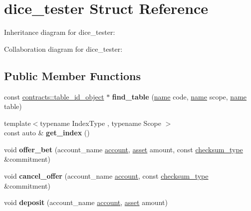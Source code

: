 \hypertarget{structdice__tester}{}\section{dice\+\_\+tester Struct Reference}
\label{structdice__tester}


Inheritance diagram for dice\+\_\+tester\+:


Collaboration diagram for dice\+\_\+tester\+:
\subsection*{Public Member Functions}
\begin{DoxyCompactItemize}
\item 
\mbox{\label{structdice__tester_acbb49bccd8d11937eb1e16b912f11a55}} 
const \mbox{\hyperlink{classaacio_1_1chain_1_1contracts_1_1table__id__object}{contracts\+::table\+\_\+id\+\_\+object}} $\ast$ {\bfseries find\+\_\+table} (\mbox{\hyperlink{structaacio_1_1name}{name}} code, \mbox{\hyperlink{structaacio_1_1name}{name}} scope, \mbox{\hyperlink{structaacio_1_1name}{name}} table)
\item 
\mbox{\label{structdice__tester_af6d80841bf61f9543fad2e4060cea135}} 
{\footnotesize template$<$typename Index\+Type , typename Scope $>$ }\\const auto \& {\bfseries get\+\_\+index} ()
\item 
\mbox{\label{structdice__tester_a12ac8f62896ba5ee9a10e6bee184c415}} 
void {\bfseries offer\+\_\+bet} (account\+\_\+name \mbox{\hyperlink{structaccount}{account}}, \mbox{\hyperlink{structaacio_1_1asset}{asset}} amount, const \mbox{\hyperlink{classfc_1_1sha256}{checksum\+\_\+type}} \&commitment)
\item 
\mbox{\label{structdice__tester_a1c830817a50823c8ce81811864520387}} 
void {\bfseries cancel\+\_\+offer} (account\+\_\+name \mbox{\hyperlink{structaccount}{account}}, const \mbox{\hyperlink{classfc_1_1sha256}{checksum\+\_\+type}} \&commitment)
\item 
\mbox{\label{structdice__tester_a905bf1a0b1ed4a6f6a7e5ac5734d17e8}} 
void {\bfseries deposit} (account\+\_\+name \mbox{\hyperlink{structaccount}{account}}, \mbox{\hyperlink{structaacio_1_1asset}{asset}} amount)

\end{DoxyCompactItemize}
